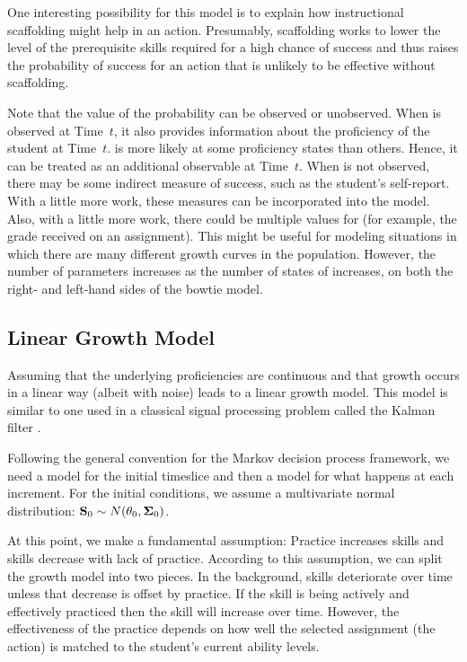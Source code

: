 \documentclass[12pt]{RR-article}
\begin{document}
One interesting possibility for this model is to explain how
instructional scaffolding might help in an action.  Presumably,
scaffolding works to lower the level of the prerequisite skills
required for a high chance of success and thus raises the probability
of success for an action that is unlikely to be effective without
scaffolding.

Note that the value of the  probability can be observed
or unobserved.  When  is observed at Time~$t$, it also
provides information about the proficiency of the student at Time~$t$.
 is more likely at some proficiency states than others.  Hence,
it can be treated as an additional observable at Time~$t$.  When
 is not observed, there may be some indirect measure of
success, such as the student's self-report.  With a little more work,
these measures can be incorporated into the model.  Also, with a little more
work, there could be multiple values for  (for example,
the grade received on an assignment).  This might be useful for
modeling situations in which there are many different growth curves in
the population.  However, the number of parameters increases as the
number of states of  increases, on both the right- and
left-hand sides of the bowtie model.

\subsection{Linear Growth Model}
\label{sect:Lin}


Assuming that the underlying proficiencies are continuous
and that growth occurs in a linear way (albeit with noise) leads to a
linear growth model.  This model is similar to one used in a classical
signal processing problem called the Kalman filter
\cite{KalmanBucy1961}.

Following the general convention for the Markov decision process
framework, we need a model for the initial timeslice and then a model
for what happens at each increment.  For the initial conditions, we
assume a multivariate normal distribution:  ${\bf S}_0 \sim N({\bf
\theta}_0, {\bf \Sigma}_0)$.

At this point, we make a fundamental assumption:  Practice increases
skills and skills decrease with lack of practice.  According to this
assumption, we can split the growth model into two pieces.  In the
background, skills deteriorate over time unless that decrease is
offset by practice.  If the skill is being actively and effectively
practiced then the skill will increase over time.  However, the
effectiveness of the practice depends on how well the selected
assignment (the action) is matched to the student's current ability
levels.
\end{document}
